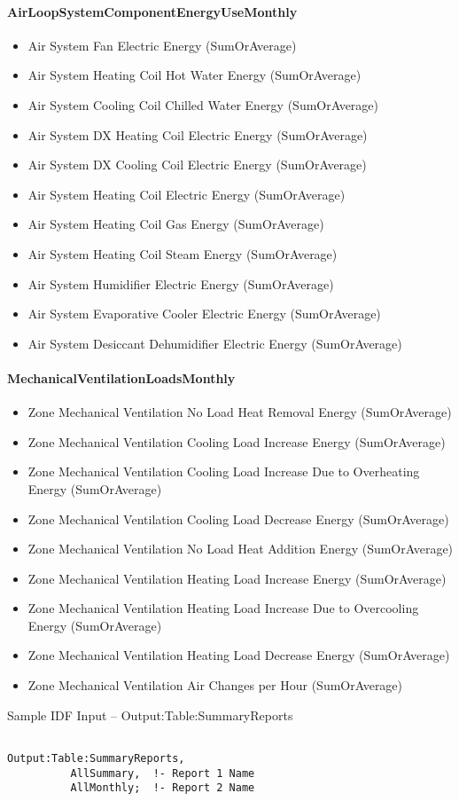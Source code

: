 \paragraph{AirLoopSystemComponentEnergyUseMonthly}\label{airloopsystemcomponentenergyusemonthly}

\begin{itemize}
\item
  Air System Fan Electric Energy (SumOrAverage)
\item
  Air System Heating Coil Hot Water Energy (SumOrAverage)
\item
  Air System Cooling Coil Chilled Water Energy (SumOrAverage)
\item
  Air System DX Heating Coil Electric Energy (SumOrAverage)
\item
  Air System DX Cooling Coil Electric Energy (SumOrAverage)
\item
  Air System Heating Coil Electric Energy (SumOrAverage)
\item
  Air System Heating Coil Gas Energy (SumOrAverage)
\item
  Air System Heating Coil Steam Energy (SumOrAverage)
\item
  Air System Humidifier Electric Energy (SumOrAverage)
\item
  Air System Evaporative Cooler Electric Energy (SumOrAverage)
\item
  Air System Desiccant Dehumidifier Electric Energy (SumOrAverage)
\end{itemize}

\paragraph{MechanicalVentilationLoadsMonthly}\label{mechanicalventilationloadsmonthly}

\begin{itemize}
\item
  Zone Mechanical Ventilation No Load Heat Removal Energy (SumOrAverage)
\item
  Zone Mechanical Ventilation Cooling Load Increase Energy (SumOrAverage)
\item
  Zone Mechanical Ventilation Cooling Load Increase Due to Overheating Energy (SumOrAverage)
\item
  Zone Mechanical Ventilation Cooling Load Decrease Energy (SumOrAverage)
\item
  Zone Mechanical Ventilation No Load Heat Addition Energy (SumOrAverage)
\item
  Zone Mechanical Ventilation Heating Load Increase Energy (SumOrAverage)
\item
  Zone Mechanical Ventilation Heating Load Increase Due to Overcooling Energy (SumOrAverage)
\item
  Zone Mechanical Ventilation Heating Load Decrease Energy (SumOrAverage)
\item
  Zone Mechanical Ventilation Air Changes per Hour (SumOrAverage)
\end{itemize}

Sample IDF Input -- Output:Table:SummaryReports

\begin{lstlisting}

Output:Table:SummaryReports,
          AllSummary,  !- Report 1 Name
          AllMonthly;  !- Report 2 Name
\end{lstlisting}
